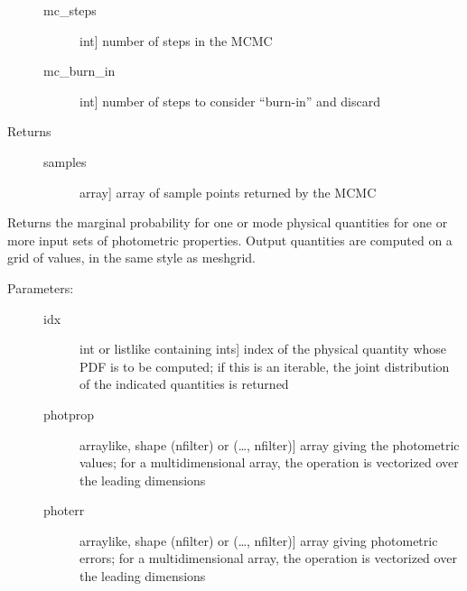 \documentclass[letterpaper,10pt,english]{sphinxmanual}
\begin{document}
\begin{fulllineitems}
\begin{fulllineitems}
\begin{description}
\begin{description}
\item[{mc\_steps}] \leavevmode{[}int{]}
number of steps in the MCMC

\item[{mc\_burn\_in}] \leavevmode{[}int{]}
number of steps to consider “burn-in” and discard

\end{description}

\item[{Returns}] \leavevmode\begin{description}
\item[{samples}] \leavevmode{[}array{]}
array of sample points returned by the MCMC

\end{description}

\end{description}

\end{fulllineitems}


\begin{fulllineitems}
\label{\detokenize{bayesphot:slugpy.bayesphot.bp.bp.mpdf}}
Returns the marginal probability for one or mode physical
quantities for one or more input sets of photometric
properties. Output quantities are computed on a grid of
values, in the same style as meshgrid.
\begin{description}
\item[{Parameters:}] \leavevmode\begin{description}
\item[{idx}] \leavevmode{[}int or listlike containing ints{]}
index of the physical quantity whose PDF is to be
computed; if this is an iterable, the joint distribution of
the indicated quantities is returned

\item[{photprop}] \leavevmode{[}arraylike, shape (nfilter) or (…, nfilter){]}
array giving the photometric values; for a
multidimensional array, the operation is vectorized over
the leading dimensions

\item[{photerr}] \leavevmode{[}arraylike, shape (nfilter) or (…, nfilter){]}
array giving photometric errors; for a multidimensional
array, the operation is vectorized over the leading
dimensions


\end{description}
\end{description}
\end{fulllineitems}
\end{fulllineitems}
\end{document}
